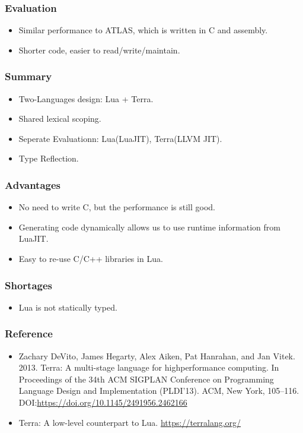\documentclass{beamer}
\begin{document}
\begin{frame}
	\frametitle{Evaluation}
  \begin{itemize}
  \item Similar performance to ATLAS, which is written in C and assembly.\pause
  \item Shorter code, easier to read/write/maintain.
  \end{itemize}
\end{frame}

\begin{frame}
	\frametitle{Summary}
  \begin{itemize}
  \item Two-Languages design: Lua + Terra.\pause
  \item Shared lexical scoping.\pause
  \item Seperate Evaluationn: Lua(LuaJIT), Terra(LLVM JIT).\pause
  \item Type Reflection.
  \end{itemize}
\end{frame}

\begin{frame}
	\frametitle{Advantages}
  \begin{itemize}
  \item No need to write C, but the performance is still good.\pause
  \item Generating code dynamically allows us to use runtime information from LuaJIT.\pause
  \item Easy to re-use C/C++ libraries in Lua.\pause
  \end{itemize}
\end{frame}

\begin{frame}
	\frametitle{Shortages}
  \begin{itemize}
  \item Lua is not statically typed.
  \end{itemize}
\end{frame}

\begin{frame}
	\frametitle{Reference}
  \begin{itemize}
  \item Zachary DeVito, James Hegarty, Alex Aiken, Pat Hanrahan, and Jan Vitek. 2013. Terra: A multi-stage language for highperformance computing. In Proceedings of the 34th ACM SIGPLAN Conference on Programming Language Design and Implementation (PLDI’13). ACM, New York, 105–116. DOI:\url{https://doi.org/10.1145/2491956.2462166}
  \item Terra: A low-level counterpart to Lua. \url{https://terralang.org/}
  \end{itemize}
\end{frame}
\end{document}
